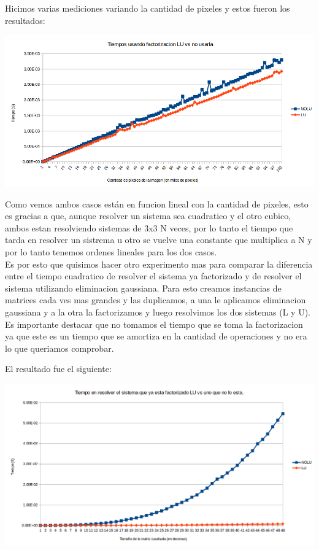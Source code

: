 Hicimos varias mediciones variando la cantidad de pixeles y estos fueron los resultados:

{\centering
    \includegraphics[scale=0.7]{informe/imagenes/LUVSNOLU.PNG} \\
}

Como vemos ambos casos están en funcion lineal con la cantidad de pixeles, esto es gracias a que, aunque resolver un sistema sea cuadratico y el otro cubico, ambos estan resolviendo sistemas de 3x3 N veces, por lo tanto el tiempo que tarda en resolver un sistrema u otro se vuelve una constante que multiplica a N y por lo tanto tenemos ordenes lineales para los dos casos.\\

Es por esto que quisimos hacer otro experimento mas para comparar la diferencia entre el tiempo cuadratico de resolver el sistema ya factorizado y de resolver el sistema utilizando eliminacion gaussiana.
Para esto creamos instancias de matrices cada ves mas grandes y las duplicamos, a una le aplicamos eliminacion gaussiana y a la otra la factorizamos y luego resolvimos los dos sistemas (L y U). Es importante destacar que no tomamos el tiempo que se toma la factorizacion ya que este es un tiempo que se amortiza en la cantidad de operaciones y no era lo que queriamos comprobar.

El resultado fue el siguiente:

{\centering
    \includegraphics[scale=0.6]{informe/imagenes/LUVSNOLUDIM.PNG} \\
}

